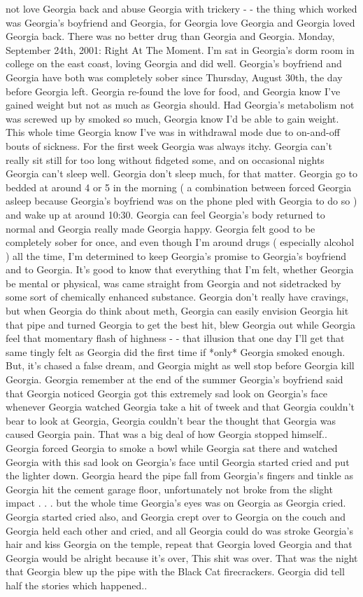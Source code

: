 \documentclass[12pt]{book}
\begin{document}
not love Georgia back and abuse Georgia with trickery - - the thing which worked was Georgia's boyfriend and Georgia, for Georgia love Georgia and Georgia loved Georgia back. There was no better drug than Georgia and Georgia. Monday, September 24th, 2001: Right At The Moment. I'm sat in Georgia's dorm room in college on the east coast, loving Georgia and did well. Georgia's boyfriend and Georgia have both was completely sober since Thursday, August 30th, the day before Georgia left. Georgia re-found the love for food, and Georgia know I've gained weight but not as much as Georgia should. Had Georgia's metabolism not was screwed up by smoked so much, Georgia know I'd be able to gain weight. This whole time Georgia know I've was in withdrawal mode due to on-and-off bouts of sickness. For the first week Georgia was always itchy. Georgia can't really sit still for too long without fidgeted some, and on occasional nights Georgia can't sleep well. Georgia don't sleep much, for that matter. Georgia go to bedded at around 4 or 5 in the morning ( a combination between forced Georgia asleep because Georgia's boyfriend was on the phone pled with Georgia to do so ) and wake up at around 10:30. Georgia can feel Georgia's body returned to normal and Georgia really made Georgia happy. Georgia felt good to be completely sober for once, and even though I'm around drugs ( especially alcohol ) all the time, I'm determined to keep Georgia's promise to Georgia's boyfriend and to Georgia. It's good to know that everything that I'm felt, whether Georgia be mental or physical, was came straight from Georgia and not sidetracked by some sort of chemically enhanced substance. Georgia don't really have cravings, but when Georgia do think about meth, Georgia can easily envision Georgia hit that pipe and turned Georgia to get the best hit, blew Georgia out while Georgia feel that momentary flash of highness - - that illusion that one day I'll get that same tingly felt as Georgia did the first time if *only* Georgia smoked enough. But, it's chased a false dream, and Georgia might as well stop before Georgia kill Georgia. Georgia remember at the end of the summer Georgia's boyfriend said that Georgia noticed Georgia got this extremely sad look on Georgia's face whenever Georgia watched Georgia take a hit of tweek and that Georgia couldn't bear to look at Georgia, Georgia couldn't bear the thought that Georgia was caused Georgia pain. That was a big deal of how Georgia stopped himself.. Georgia forced Georgia to smoke a bowl while Georgia sat there and watched Georgia with this sad look on Georgia's face until Georgia started cried and put the lighter down. Georgia heard the pipe fall from Georgia's fingers and tinkle as Georgia hit the cement garage floor, unfortunately not broke from the slight impact . . .  but the whole time Georgia's eyes was on Georgia as Georgia cried. Georgia started cried also, and Georgia crept over to Georgia on the couch and Georgia held each other and cried, and all Georgia could do was stroke Georgia's hair and kiss Georgia on the temple, repeat that Georgia loved Georgia and that Georgia would be alright because it's over, This shit was over. That was the night that Georgia blew up the pipe with the Black Cat firecrackers. Georgia did tell half the stories which happened.. 
\end{document}
